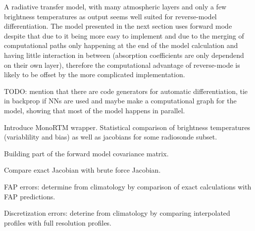         A radiative transfer model, with many atmospheric layers and only
        a few brightness temperatures as output seems well suited for
        reverse-model differentiation. The model presented in the next section
        uses forward mode despite that due to it being more easy to implement
        and due to the merging of computational paths only happening at the end
        of the model calculation and having little interaction in between
        (absorption coefficients are only dependend on their own layer),
        therefore the computational advantage of reverse-mode is likely to be
        offset by the more complicated implementation.

        TODO: mention that there are code generators for automatic
        differentiation, tie in backprop if NNs are used and maybe make a
        computational graph for the model, showing that most of the model
        happens in parallel.

    \stopsubsection


    \startsubsection[title=Evaluation of Model Performance]

        Introduce MonoRTM wrapper. Statistical comparison of brightness
        temperatures (variablility and bias) as well as jacobians for some
        radiosonde subset.

    \stopsubsection

\stopsection


\startsection[title={Characterization of Errors},reference={ch:rtm_errors}]

    Building part of the forward model covariance matrix.

    Compare exact Jacobian with brute force Jacobian.

    FAP errors: determine from climatology by comparison of exact
    calculations with FAP predictions.

    Discretization errors: deterine from climatology by comparing
    interpolated profiles with full resolution profiles.

\stopsection

